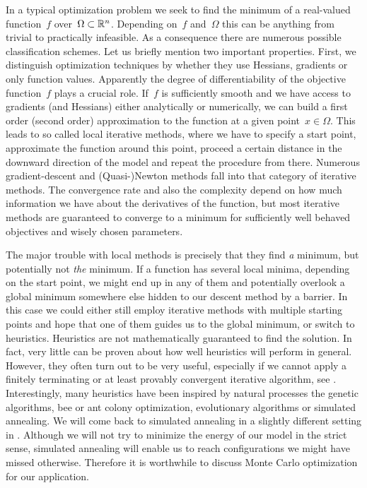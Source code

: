 In a typical optimization problem we seek to find the minimum of a real-valued
function~$f$ over~$\Omega \subset \mathbb{R}^n$. Depending on~$f$ and~$\Omega$ this can
be anything from trivial to practically infeasible. As a consequence there are
numerous possible classification schemes. Let us briefly mention two important
properties. First, we distinguish optimization techniques by whether they use
Hessians, gradients or only function values. Apparently the degree of
differentiability of the objective function~$f$ plays a crucial role. If~$f$ is
sufficiently smooth and we have access to gradients (and Hessians) either
analytically or numerically, we can build a first order (second order)
approximation to the function at a given point~$x \in \Omega$. This leads to so
called local iterative methods, where we have to specify a start point,
approximate the function around this point, proceed a certain distance in the
downward direction of the model and repeat the procedure from there. Numerous
gradient-descent and (Quasi-)Newton methods fall into that category of iterative
methods. The convergence rate and also the complexity depend on how much
information we have about the derivatives of the function, but most iterative
methods are guaranteed to converge to a minimum for sufficiently well behaved
objectives and wisely chosen parameters.

The major trouble with local methods is precisely that they find \emph{a}
minimum, but potentially not \emph{the} minimum. If a function has several local
minima, depending on the start point, we might end up in any of them and
potentially overlook a global minimum somewhere else hidden to our descent
method by a barrier. In this case we could either still employ iterative methods
with multiple starting points and hope that one of them guides us to the global
minimum, or switch to heuristics. Heuristics are not mathematically guaranteed
to find the solution. In fact, very little can be proven about how well
heuristics will perform in general. However, they often turn out to be very
useful, especially if we cannot apply a finitely terminating or at least
provably convergent iterative algorithm, see .
Interestingly, many heuristics have been inspired by natural processes the
genetic algorithms, bee or ant colony optimization, evolutionary algorithms or
simulated annealing. We will come back to simulated annealing in a slightly
different setting in . Although we will not try to minimize
the energy of our model in the strict sense, simulated annealing will enable us
to reach configurations we might have missed otherwise. Therefore it is
worthwhile to discuss Monte Carlo optimization for our application.

